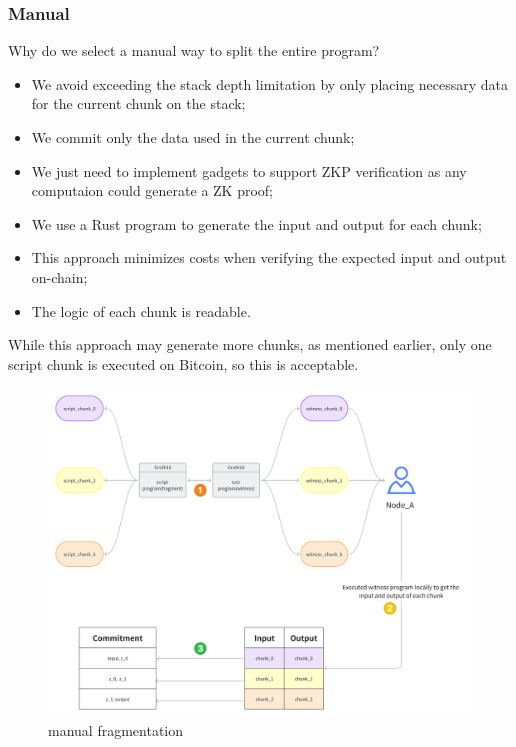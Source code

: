 \subsubsection{Manual}

Why do we select a manual way to split the entire program?

\begin{itemize}
    \item We avoid exceeding the stack depth limitation by only placing necessary data for the current chunk on the stack;
    \item We commit only the data used in the current chunk;
    \item We just need to implement gadgets to support ZKP verification as any computaion could generate a ZK proof;
    \item We use a Rust program to generate the input and output for each chunk;
    \item This approach minimizes costs when verifying the expected input and output on-chain;
    \item The logic of each chunk is readable.
\end{itemize}


While this approach may generate more chunks, as mentioned earlier, only one script chunk is executed on Bitcoin, so this is acceptable. 

\begin{figure}[ht] 
    \centering  
    \includegraphics[width=0.85\columnwidth]{images/manually-fragment.png} 
    \caption{manual fragmentation}
    \label{fig:manually-fragment}
\end{figure}

